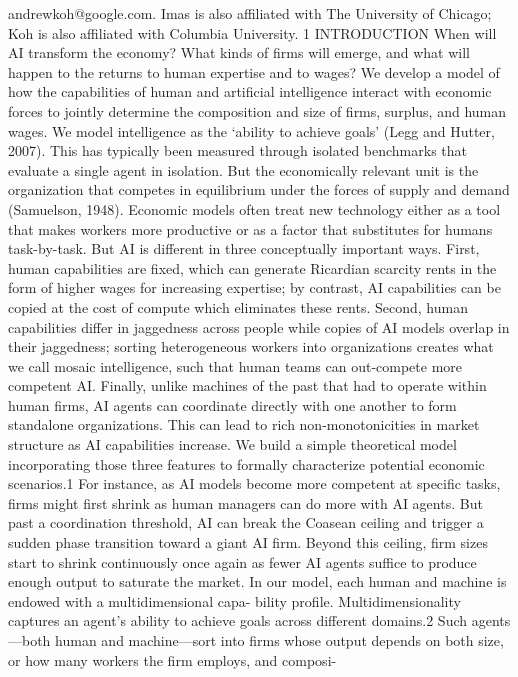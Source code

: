 andrewkoh@google.com. Imas is also affiliated with The University of Chicago; Koh is also affiliated
with Columbia University.
1 INTRODUCTION
When will AI transform the economy? What kinds of firms will emerge, and what will
happen to the returns to human expertise and to wages? We develop a model of how
the capabilities of human and artificial intelligence interact with economic forces to
jointly determine the composition and size of firms, surplus, and human wages. We
model intelligence as the ‘ability to achieve goals’ (Legg and Hutter, 2007). This has
typically been measured through isolated benchmarks that evaluate a single agent
in isolation. But the economically relevant unit is the organization that competes in
equilibrium under the forces of supply and demand (Samuelson, 1948).
Economic models often treat new technology either as a tool that makes workers more
productive or as a factor that substitutes for humans task-by-task. But AI is different
in three conceptually important ways. First, human capabilities are fixed, which can
generate Ricardian scarcity rents in the form of higher wages for increasing expertise;
by contrast, AI capabilities can be copied at the cost of compute which eliminates these
rents. Second, human capabilities differ in jaggedness across people while copies of AI
models overlap in their jaggedness; sorting heterogeneous workers into organizations
creates what we call mosaic intelligence, such that human teams can out-compete
more competent AI. Finally, unlike machines of the past that had to operate within
human firms, AI agents can coordinate directly with one another to form standalone
organizations. This can lead to rich non-monotonicities in market structure as AI
capabilities increase.
We build a simple theoretical model incorporating those three features to formally
characterize potential economic scenarios.1 For instance, as AI models become more
competent at specific tasks, firms might first shrink as human managers can do more
with AI agents. But past a coordination threshold, AI can break the Coasean ceiling
and trigger a sudden phase transition toward a giant AI firm. Beyond this ceiling, firm
sizes start to shrink continuously once again as fewer AI agents suffice to produce
enough output to saturate the market.
In our model, each human and machine is endowed with a multidimensional capa-
bility profile. Multidimensionality captures an agent’s ability to achieve goals across
different domains.2 Such agents—both human and machine—sort into firms whose
output depends on both size, or how many workers the firm employs, and composi-
